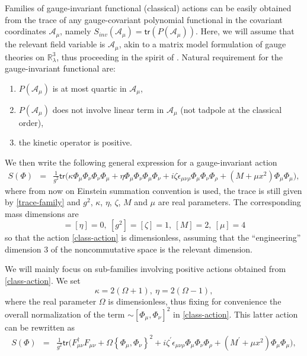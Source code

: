\documentclass[11pt]{book}
\newcommand{\tr}{\mathsf{tr}}
\theoremstyle{break}
\begin{document}
Families of gauge-invariant functional (classical) actions can be easily obtained from the trace of any gauge-covariant polynomial functional in the covariant coordinates $\mathcal{A}_\mu$, namely $S_{inv}(\mathcal{A}_\mu)=\tr\left(P(\mathcal{A}_\mu)\right)$. Here, we will assume that the relevant field variable is $\mathcal{A}_\mu$, akin to a matrix model formulation of gauge theories on $\mathbb{R}^3_\lambda$, thus proceeding in the spirit of \cite{MVW13}. Natural requirement for the gauge-invariant functional are:
\begin{enumerate}
\item $P(\mathcal{A}_\mu)$ is at most quartic in $\mathcal{A}_\mu$,
\item $P(\mathcal{A}_\mu)$ does not involve linear term in $\mathcal{A}_\mu$ (not tadpole at the classical order),
\item the kinetic operator is positive.
\end{enumerate}
%
We then write the following general expression for a gauge-invariant action%
%
\begin{eqnarray}\label{fullaction}
S(\Phi)&=&\frac{1}{g^2} \tr\big( \kappa \Phi_\mu \Phi_\nu \Phi_\nu \Phi_\mu + \eta \Phi_\mu \Phi_\nu \Phi_\mu \Phi_\nu + i \zeta \epsilon_{\mu\nu\rho} \Phi_\mu \Phi_\nu \Phi_\rho + (M+\mu x^2) \Phi_\mu \Phi_\mu \big), \label{class-action}
\end{eqnarray}
%
where from now on Einstein summation convention is used, the trace is still given by \eqref{trace-family} and $g^2$, $\kappa$, $\eta$, $\zeta$, $M$ and $\mu$ are real parameters. The corresponding mass dimensions are
\begin{equation}
[\kappa]=[\eta]=0,\ [g^2]=[\zeta]=1,\ [M]=2,\ [\mu]=4\label{mass-dim}
\end{equation}
so that the action \eqref{class-action} is dimensionless, assuming that the ``engineering'' dimension $3$ of the noncommutative space is the relevant dimension.\par%
%
We will mainly focus on sub-families involving positive actions obtained from \eqref{class-action}. We set%
%
\begin{equation}
\kappa= 2(\Omega+1),\ \eta= 2(\Omega-1), \label{redef-param}
\end{equation}
%
where the real parameter $\Omega$ is dimensionless, thus fixing for convenience the overall normalization of the term $\sim[\Phi_\mu,\Phi_\nu]^2$ in \eqref{class-action}. This latter action can be rewritten as
\begin{eqnarray}
S(\Phi)&=&\frac{1}{g^2} \tr\big(F^\dag_{\mu\nu}F_{\mu\nu} + \Omega\left\{\Phi_\mu,\Phi_\nu\right\}^2 + i \zeta^\prime\epsilon_{\mu\nu\rho} \Phi_\mu \Phi_\nu \Phi_\rho + \left(M^\prime+\mu x^2\right) \Phi_\mu \Phi_\mu \big)\label{canonic-action},
\end{eqnarray}
\end{document}
